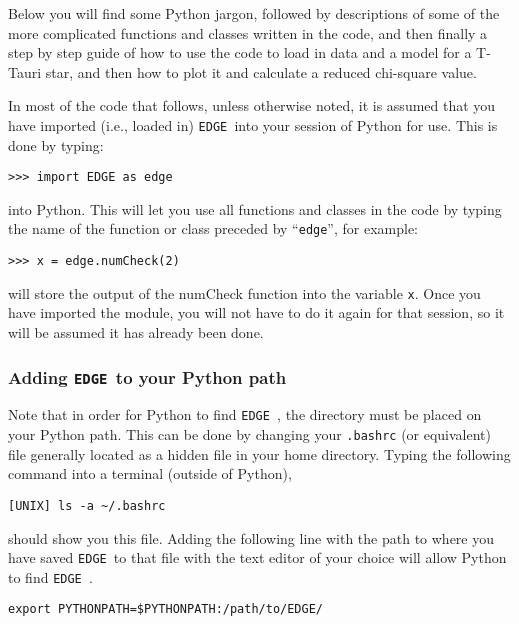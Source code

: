 \documentclass{emulateapj}
\newcommand{\edge}{\texttt{EDGE }}
\begin{document}
Below you will find some Python jargon, followed by descriptions of some of the more complicated functions and classes written in the code, and then finally a step by step guide of how to use the code to load in data and a model for a T-Tauri star, and then how to plot it and calculate a reduced chi-square value.

In most of the code that follows, unless otherwise noted, it is assumed that you have imported (i.e., loaded in) \edge into your session of Python for use. This is done by typing:

\vspace{2mm}
\texttt{>>> import EDGE as edge}
\vspace{2mm}

\noindent into Python. This will let you use all functions and classes in the code by typing the name of the function or class preceded by “\texttt{edge}”, for example: 

\vspace{2mm} 
\texttt{>>> x = edge.numCheck(2)}
\vspace{2mm}

\noindent will store the output of the numCheck function into the variable \texttt{x}. Once you have imported the module, you will not have to do it again for that session, so it will be assumed it has already been done. 

\subsubsection{Adding \edge to your Python path}

Note that in order for Python to find \edge, the directory must be placed on your Python path. This can be done by changing your \texttt{.bashrc} (or equivalent) file generally located as a hidden file in your home directory. Typing the following command into a terminal (outside of Python),

\vspace{2mm}
\texttt{[UNIX] ls -a \textasciitilde/.bashrc}
\vspace{2mm}

should show you this file. Adding the following line with the path to where you have saved \edge to that file with the text editor of your choice will allow Python to find \edge.

\vspace{2mm}
\texttt{export PYTHONPATH=\${PYTHONPATH}:/path/to/EDGE/}
\vspace{2mm}
\end{document}
